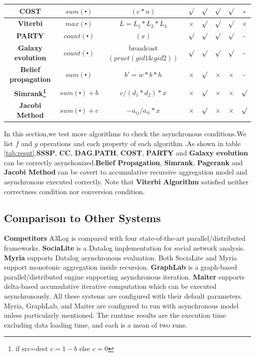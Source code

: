 \begin{table}[!t]
\begin{tabular}{c|c|c|c|c|c|c|c}
		\hline
		\textbf{COST} & $sum(\centerdot)$&$(c*n)$ & $\surd$ & $\surd$ & $\surd$ & $\surd$ & -\\
		\hline
		\textbf{Viterbi} & $max(\centerdot)$ & $L=L_1*L_2*L_3$ & $\times$ & $\surd$ &  $\surd$ &  $\surd$&$\times$\\
		\hline
		\textbf{PARTY} & $count(\centerdot)$&$(x)$ & $\surd$ & $\surd$ & $\surd$ & $\surd$ & -\\
		\hline
		\textbf{Galaxy evolution} & $count(\centerdot)$ &broadcast$(pract(gid1\& gid2))$ & $\surd$ & $\surd$ & $\surd$ & $\surd$ & -\\
		\hline
		\textbf{Belief propagation} & $sum(\centerdot)$ &$b'=w*b*h$ & $\times$ & $\surd$ & $\times$ & $\times$& -\\
		\hline
		\textbf{Simrank\footnote{if src=dest $c=1-b$ else $c=0$}} & $sum(\centerdot)+b$& $c/(d_1*d_2)*x$ & $\times$ &  $\surd$ &  $\times$ &  $\times$& $\surd$\\
		\hline
		\textbf{Jacobi Method} &$sum(\centerdot)+c$ &$-a_{ij}/a_{ii}*x$& $\times$ & $\surd$  & $\times$ & $\times$ & $\surd$\\
		\hline
		\hline
	\end{tabular}
	\vspace{-0.1in}
\end{table}

In this section,we test more algorithms to check the asynchronous conditions.We list $f$ and $g$ operations and each property of each algorithm .As shown in table \ref{tab:resut},\textbf{SSSP}, \textbf{CC}, \textbf{DAG},\textbf{PATH}, \textbf{COST}, \textbf{PARTY} and \textbf{Galaxy evolution} can be correctly asynchonized.\textbf{Belief Propagation},  \textbf{Simrank}, \textbf{Pagerank} and \textbf{Jacobi Method} can be covert to accumulative recursive aggregation model and asynchronous executed correctly. Note that \textbf{Viterbi Algorithm} satisfied neither correctness condition nor conversion condition.

\subsection{Comparison to Other Systems}
\label{sec:expr:othersystems}

\noindent\textbf{Competitors}
A3Log is compared with four state-of-the-art parallel/distributed frameworks. \textbf{SociaLite} \cite{Lam:2013:SDE:2510649.2511289,Seo:2013:DSD:2556549.2556572} is a Datalog implementation for social network analysis. \textbf{Myria} \cite{Halperin:2014:DMB:2588555.2594530,Wang:2015:AFR:2824032.2824052} supports Datalog asynchronous evaluation. Both SociaLite and Myria support monotonic aggregation inside recursion. \textbf{GraphLab} \cite{Low:2012:DGF:2212351.2212354} is a graph-based parallel/distributed engine supporting asynchronous iteration. \textbf{Maiter} \cite{maiter} supports delta-based accumulative iterative computation which can be executed asynchronously. All these systems are configured with their default parameters. Myria, GraphLab, and Maiter are configured to run with asynchronous model unless particularly mentioned. The runtime results are the execution time excluding data loading time, and each is a mean of two runs.


